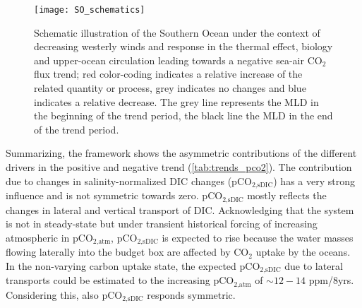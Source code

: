 \begin{figure}[hbt]
	\centering
	\texttt{[image: SO\_schematics]}
	\caption{Schematic illustration of the Southern Ocean under the context of decreasing westerly winds and response in the thermal effect, biology and upper-ocean circulation leading towards a negative sea-air CO$_2$ flux trend; red color-coding indicates a relative increase of the related quantity or process, grey indicates no changes and blue indicates a relative decrease. The grey line represents the \acf{MLD} in the beginning of the trend period, the black line the \acs{MLD} in the end of the trend period.}
	\label{fig:schematics_neg}
\end{figure}

\clearpage

Summarizing, the framework shows the asymmetric contributions of the different drivers in the positive and negative trend (\autoref{tab:trends_pco2}). The contribution due to changes in salinity-normalized \acs{DIC} changes (pCO$_{\text{2,sDIC}}$) has a very strong influence and is not symmetric towards zero. pCO$_{\text{2,sDIC}}$ mostly reflects the changes in lateral and vertical transport of \acs{DIC}. Acknowledging that the system is not in steady-state but under transient historical forcing of increasing atmospheric in pCO$_{\text{2,atm}}$, pCO$_{\text{2,sDIC}}$ is expected to rise because the water masses flowing laterally into the budget box are affected by CO$_2$ uptake by the oceans. In the non-varying carbon uptake state, the expected pCO$_{\text{2,sDIC}}$ due to lateral transports could be estimated to the increasing pCO$_{\text{2,atm}}$ of $\sim12-14$ ppm/8yrs. Considering this, also pCO$_{\text{2,sDIC}}$ responds symmetric.\newline

